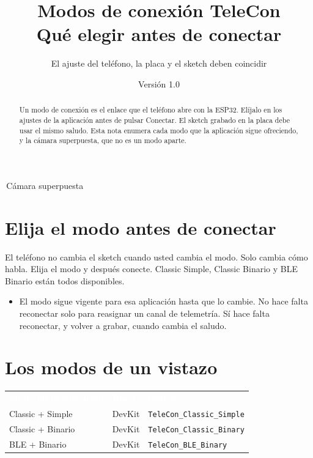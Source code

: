 \documentclass[12pt,a4paper]{article}
\title{Modos de conexión TeleCon\\[0.3em]
\large Qué elegir antes de conectar}
\author{El ajuste del teléfono, la placa y el sketch deben coincidir}
\date{Versión 1.0 \quad 2026}
\newcommand{\code}[1]{\nolinkurl{#1}}
\newcommand{\thc}[1]{\textcolor{white}{\bfseries #1}}
\newcommand{\chip}[2]{\colorbox{#1}{\strut\,\scriptsize #2\,}}
\begin{document}
\maketitle

\begin{abstract}
Un modo de conexión es el enlace que el teléfono abre con la ESP32.
Elíjalo en los ajustes de la aplicación antes de pulsar Conectar. El
sketch grabado en la placa debe usar el mismo saludo. Esta nota enumera
cada modo que la aplicación sigue ofreciendo, y la cámara superpuesta,
que no es un modo aparte.
\end{abstract}

{\sffamily\scriptsize
\chip{TblKnob}{Cámara superpuesta}}

\tableofcontents
\vspace{1em}

\section{Elija el modo antes de conectar}

El teléfono no cambia el sketch cuando usted cambia el modo. Solo cambia
cómo habla. Elija el modo y después conecte. Classic Simple, Classic
Binario y BLE Binario están todos disponibles.

\begin{itemize}[leftmargin=1.4cm]
  \item El modo sigue vigente para esa aplicación hasta que lo cambie.
        No hace falta reconectar solo para reasignar un canal de
        telemetría. Sí hace falta reconectar, y volver a grabar, cuando
        cambia el saludo.
\end{itemize}

\section{Los modos de un vistazo}

\begin{center}
\small
\renewcommand{\arraystretch}{1.25}
\setlength{\tabcolsep}{4pt}
\begin{tabular}{>{\raggedright\arraybackslash}p{4.2cm}
                >{\raggedright\arraybackslash}p{2.4cm}
                >{\raggedright\arraybackslash}p{7.2cm}}
\rowcolor{TblHead}
\thc{Modo en la aplicación} & \thc{Placa} & \thc{Sketch} \\
\rowcolor{TblChan}
Classic + Simple & DevKit & \code{TeleCon_Classic_Simple} \\
\rowcolor{TblChan}
Classic + Binario & DevKit & \code{TeleCon_Classic_Binary} \\
\rowcolor{TblChan}
BLE + Binario & DevKit & \code{TeleCon_BLE_Binary} \\
\end{tabular}
\end{center}
\end{document}
